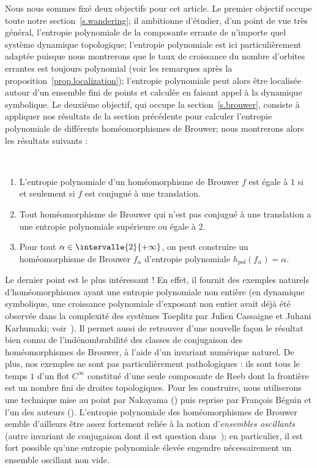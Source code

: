 Nous nous sommes fixé deux objectifs pour cet article. Le premier objectif occupe toute notre section~\ref{s.wandering}; il ambitionne d'étudier, d'un point de vue très général, l'entropie polynomiale de la composante errante de n'importe quel système dynamique topologique; l'entropie polynomiale est ici particulièrement adaptée puisque nous montrerons que le taux de croissance du nombre d'orbites errantes est toujours polynomial (voir les remarques après la proposition~\ref{prop.localization}); l'entropie polynomiale peut alors être localisée autour d'un ensemble fini de points et calculée en faisant appel à la dynamique symbolique. Le deuxième objectif, qui occupe la section~\ref{s.brouwer}, consiste à appliquer nos résultats de la section précédente pour calculer l'entropie polynomiale de différents homéomorphismes de Brouwer; nous montrerons alors les résultats suivants :

\begin{theoc}\ \label{theo}
\begin{enumerate}%
\item \label{1.1.1} L'entropie polynomiale d'un homéomorphisme de Brouwer $f$ est égale à $1$ si et seulement si $f$ est conjugué à une translation.

\item \label{1.1.2} Tout homéomorphisme de Brouwer qui n'est pas conjugué à une translation a une entropie polynomiale supérieure ou égale à $2$.

\item \label{1.1.3} Pour tout $\alpha \in \intervalle{2}{+\infty}$, on peut construire un homéomorphisme de Brouwer $f_{\alpha}$ d'entropie polynomiale $h_{pol}(f_{\alpha}) =\alpha$.
\end{enumerate}
\end{theoc}

Le dernier point est le plus intéressant ! En effet, il fournit des exemples naturels d'homéomorphismes ayant une entropie polynomiale non entière (en dynamique symbolique, une croissance polynomiale d'exposant non entier avait déjà été observée dans la complexité des systèmes Toeplitz par Julien Cassaigne et Juhani Karhumaki; voir~\cite[section~5]{CasKar97}). Il permet aussi de retrouver d'une nouvelle façon le résultat bien connu de l'indénombrabilité des classes de conjugaison des homéomorphismes de Brouwer, à l'aide d'un invariant numérique naturel. De plus, nos exemples ne sont pas particulièrement \og pathologiques\fg{} : ils sont tous le temps $1$ d'un flot $C^\infty$ constitué d'une seule composante de Reeb dont la frontière est un nombre fini de droites topologiques. Pour les construire, nous utiliserons une technique mise au point par Nakayama (\cite{Nak95}) puis reprise par François Béguin et l'un des auteurs (\cite{BegLer03}). L'entropie polynomiale des homéomorphismes de Brouwer semble d'ailleurs être assez fortement reliée à la notion d'\emph{ensembles oscillants} (autre invariant de conjugaison dont il est question dans~\cite{BegLer03}); en particulier, il est fort possible qu'une entropie polynomiale élevée engendre nécessairement un ensemble oscillant non vide.


